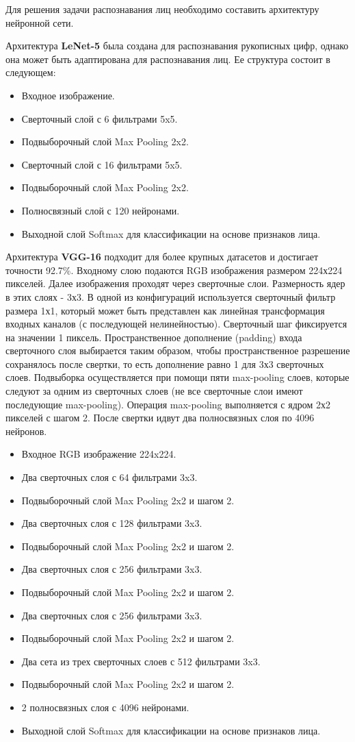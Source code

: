 Для решения задачи распознавания лиц необходимо составить архитектуру нейронной сети.

Архитектура \textbf{LeNet-5} была создана для распознавания рукописных цифр, однако она может быть адаптирована для распознавания лиц. Ее структура состоит в следующем:
\begin{itemize}
\item Входное изображение.
\item Сверточный слой с 6 фильтрами 5x5.
\item Подвыборочный слой Max Pooling 2x2.
\item Сверточный слой с 16 фильтрами 5x5.
\item Подвыборочный слой Max Pooling 2x2.
\item Полносвязный слой с 120 нейронами.
\item Выходной слой Softmax для классификации на основе признаков лица.
\end{itemize}

Архитектура \textbf{VGG-16} подходит для более крупных датасетов и достигает точности 92.7\%. Входному слою подаются RGB изображения размером 224х224 пикселей. Далее изображения проходят через сверточные слои. Размерность ядер в этих слоях - 3х3.
В одной из конфигураций используется сверточный фильтр размера 1х1, который может быть представлен как линейная трансформация входных каналов (с последующей нелинейностью). Сверточный шаг фиксируется на значении 1 пиксель. Пространственное дополнение (padding) входа сверточного слоя выбирается таким образом, чтобы пространственное разрешение сохранялось после свертки, то есть дополнение равно 1 для 3х3 сверточных слоев. Подвыборка осуществляется при помощи пяти max-pooling слоев, которые следуют за одним из сверточных слоев (не все сверточные слои имеют последующие max-pooling). Операция max-pooling выполняется с ядром 2х2 пикселей с шагом 2. После свертки  идвут два полносвязных слоя по 4096 нейронов.
\begin{itemize}
\item Входное RGB изображение 224x224.
\item Два сверточных слоя с 64 фильтрами 3x3.
\item Подвыборочный слой Max Pooling 2x2 и шагом 2.
\item Два сверточных слоя с 128 фильтрами 3x3.
\item Подвыборочный слой Max Pooling 2x2 и шагом 2.
\item Два сверточных слоя с 256 фильтрами 3x3.
\item Подвыборочный слой Max Pooling 2x2 и шагом 2.
\item Два сверточных слоя с 256 фильтрами 3x3.
\item Подвыборочный слой Max Pooling 2x2 и шагом 2.
\item Два сета из трех сверточных слоев с 512 фильтрами 3x3.
\item Подвыборочный слой Max Pooling 2x2 и шагом 2.
\item 2 полносвязных слоя с 4096 нейронами.
\item Выходной слой Softmax для классификации на основе признаков лица.
\end{itemize}

